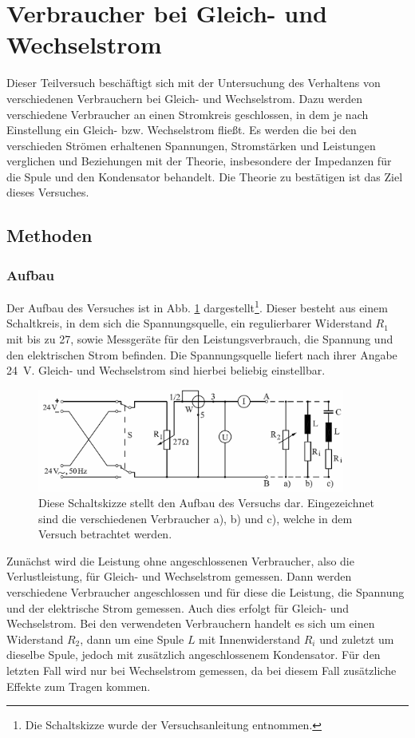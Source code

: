 \section{Verbraucher bei Gleich- und Wechselstrom} 

Dieser Teilversuch beschäftigt sich mit der Untersuchung des Verhaltens von verschiedenen Verbrauchern bei Gleich- und Wechselstrom.
Dazu werden verschiedene Verbraucher an einen Stromkreis geschlossen, in dem je nach Einstellung ein Gleich- bzw. Wechselstrom fließt.
Es werden die bei den verschieden Strömen erhaltenen Spannungen, Stromstärken und Leistungen verglichen und Beziehungen mit der Theorie, insbesondere der Impedanzen für die Spule und den Kondensator behandelt. 
Die Theorie zu bestätigen ist das Ziel dieses Versuches.

\subsection{Methoden}

\subsubsection{Aufbau}

Der Aufbau des Versuches ist in Abb. \ref{fig:Schaltskizze} dargestellt\footnote{Die Schaltskizze wurde der Versuchsanleitung entnommen.}.
Dieser besteht aus einem Schaltkreis, in dem sich die Spannungsquelle, ein regulierbarer Widerstand  $R_1$ mit bis zu \SI{27}{\Omega}, sowie Messgeräte für den Leistungsverbrauch, die Spannung und den elektrischen Strom befinden. 
Die Spannungsquelle liefert nach ihrer Angabe \SI{24}{\V}. Gleich- und Wechselstrom sind hierbei beliebig einstellbar.
\begin{figure}[ht]
	\centering
	\includegraphics[width=0.9\textwidth]{auswertung/Schaltung2.png}
	\caption{Diese Schaltskizze stellt den Aufbau des Versuchs dar. Eingezeichnet sind die verschiedenen Verbraucher a), b) und c), welche in dem Versuch betrachtet werden.}
	\label{fig:Schaltskizze}	
\end{figure}
Zunächst wird die Leistung ohne angeschlossenen Verbraucher, also die Verlustleistung, für Gleich- und Wechselstrom gemessen. 
Dann werden verschiedene Verbraucher angeschlossen und für diese die Leistung, die Spannung und der elektrische Strom gemessen.
Auch dies erfolgt für Gleich- und Wechselstrom.
Bei den verwendeten Verbrauchern handelt es sich um einen Widerstand $R_2$, dann um eine Spule $L$ mit Innenwiderstand $R_i$ und zuletzt um dieselbe Spule, jedoch mit zusätzlich angeschlossenem Kondensator.
Für den letzten Fall wird nur bei Wechselstrom gemessen, da bei diesem Fall zusätzliche Effekte zum Tragen kommen.

